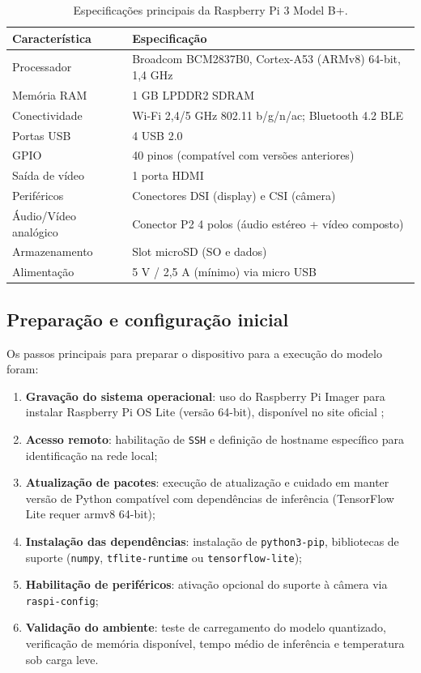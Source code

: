 \documentclass[repeatfields,xlists,xpacks,oneside]{ufrgscca}
\begin{document}
\begin{table}[H]
    \centering
    \caption{Especificações principais da Raspberry Pi 3 Model B+.}\label{tab:rpi3_specs}
    \begin{tabular}{p{}|p{}}
    \hline
    	\textbf{Característica} & \textbf{Especificação} \\
    \hline
    Processador & Broadcom BCM2837B0, Cortex-A53 (ARMv8) 64-bit, 1{,}4 GHz \\
    Memória RAM & 1 GB LPDDR2 SDRAM \\
    Conectividade & Wi-Fi 2{,}4/5 GHz 802.11 b/g/n/ac; Bluetooth 4.2 BLE \\
    Portas USB & 4 USB 2.0 \\
    GPIO & 40 pinos (compatível com versões anteriores) \\
    Saída de vídeo & 1 porta HDMI \\
    Periféricos & Conectores DSI (display) e CSI (câmera) \\
    Áudio/Vídeo analógico & Conector P2 4 polos (áudio estéreo + vídeo composto) \\
    Armazenamento & Slot microSD (SO e dados) \\
    Alimentação & 5 V / 2{,}5 A (mínimo) via micro USB \\
    \hline
    \end{tabular}
    {}
\end{table}

\subsection{Preparação e configuração inicial}
Os passos principais para preparar o dispositivo para a execução do modelo foram:
\begin{enumerate}
    \item \textbf{Gravação do sistema operacional}: uso do Raspberry Pi Imager para instalar Raspberry Pi OS Lite (versão 64-bit), disponível no site oficial \cite{rpi3};
    \item \textbf{Acesso remoto}: habilitação de \texttt{SSH} e definição de hostname específico para identificação na rede local;
    \item \textbf{Atualização de pacotes}: execução de atualização e cuidado em manter versão de Python compatível com dependências de inferência (TensorFlow Lite requer armv8 64-bit);
    \item \textbf{Instalação das dependências}: instalação de \texttt{python3-pip}, bibliotecas de suporte (\texttt{numpy}, \texttt{tflite-runtime} ou \texttt{tensorflow-lite});
    \item \textbf{Habilitação de periféricos}: ativação opcional do suporte à câmera via \texttt{raspi-config};
    \item \textbf{Validação do ambiente}: teste de carregamento do modelo quantizado, verificação de memória disponível, tempo médio de inferência e temperatura sob carga leve.
\end{enumerate}
\end{document}
